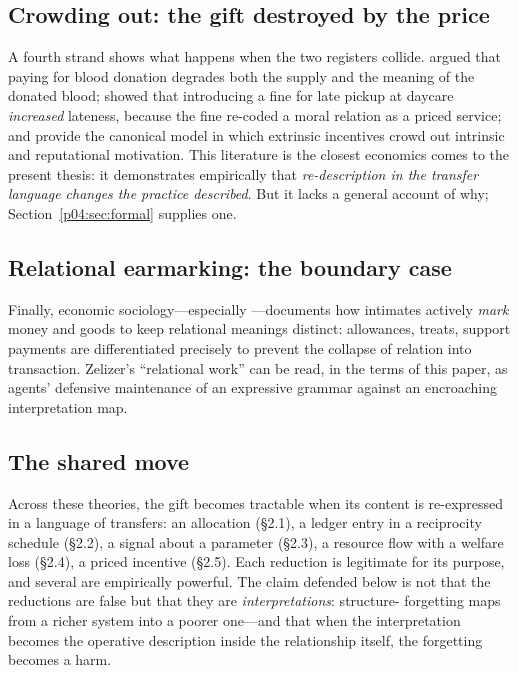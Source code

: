 \documentclass[11pt,a4paper]{article}
\begin{document}
\subsection{Crowding out: the gift destroyed by the price}
A fourth strand shows what happens when the two registers collide.
\textcite{titmuss1970} argued that paying for blood donation degrades both the
supply and the meaning of the donated blood; \textcite{gneezy2000} showed that
introducing a fine for late pickup at daycare \emph{increased} lateness,
because the fine re-coded a moral relation as a priced service; and
\textcite{benabou2006} provide the canonical model in which extrinsic incentives
crowd out intrinsic and reputational motivation. This literature is the
closest economics comes to the present thesis: it demonstrates empirically
that \emph{re-description in the transfer language changes the practice
described}. But it lacks a general account of why; Section~\ref{p04:sec:formal}
supplies one.

\subsection{Relational earmarking: the boundary case}
Finally, economic sociology---especially \textcite{zelizer2005}---documents how
intimates actively \emph{mark} money and goods to keep relational meanings
distinct: allowances, treats, support payments are differentiated precisely
to prevent the collapse of relation into transaction. Zelizer's ``relational
work'' can be read, in the terms of this paper, as agents' defensive
maintenance of an expressive grammar against an encroaching interpretation
map.

\subsection{The shared move}
\label{p04:sec:sharedmove}
Across these theories, the gift becomes tractable when its content is
re-expressed in a language of transfers: an allocation
(\S2.1), a ledger entry in a reciprocity schedule (\S2.2), a signal
about a parameter (\S2.3), a resource flow with a welfare loss (\S2.4),
a priced incentive (\S2.5). Each reduction is legitimate for its purpose, and
several are empirically powerful. The claim defended below is not that the
reductions are false but that they are \emph{interpretations}: structure-
forgetting maps from a richer system into a poorer one---and that when the
interpretation becomes the operative description inside the relationship
itself, the forgetting becomes a harm.
\end{document}
